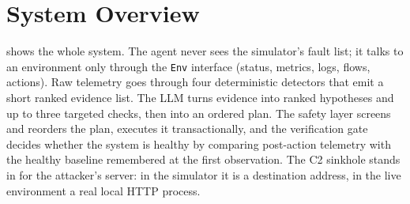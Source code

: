 \documentclass[11pt,a4paper]{article}
\newcommand{\code}[1]{\texttt{#1}}
\begin{document}
\section{System Overview}
\label{sec:overview}

 shows the whole system. The agent never sees the simulator's fault list; it talks to
an environment only through the \code{Env} interface (status, metrics, logs, flows, actions). Raw
telemetry goes through four deterministic detectors that emit a short ranked evidence list. The LLM
turns evidence into ranked hypotheses and up to three targeted checks, then into an ordered plan.
The safety layer screens and reorders the plan, executes it transactionally, and the verification
gate decides whether the system is healthy by comparing post-action telemetry with the healthy
baseline remembered at the first observation. The C2 sinkhole stands in for the attacker's server:
in the simulator it is a destination address, in the live environment a real local HTTP process.
\end{document}
